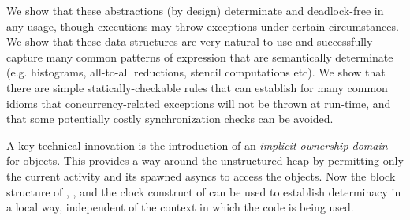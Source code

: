 We show that these abstractions (by design) determinate and
deadlock-free in any usage, though executions may throw exceptions
under certain circumstances. We show that these data-structures are
very natural to use and successfully capture many common patterns of
expression that are semantically determinate (e.g. histograms,
all-to-all reductions, stencil computations etc). We show that there
are simple statically-checkable rules that can establish for many
common idioms that concurrency-related exceptions will not be thrown
at run-time, and that some potentially costly synchronization checks
can be avoided.

A key technical innovation is the introduction of an {\em implicit
  ownership domain} for objects. This provides a way around the
unstructured heap by permitting only the current activity and its
spawned asyncs to access the objects. Now the block structure of
, ,  and the clock construct of
\Xten{} can be used to establish determinacy in a local way,
independent of the context in which the code is being used. 

